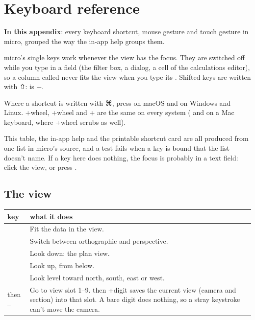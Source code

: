 \chapter{Keyboard reference}\label{app:keys}\label{ch:keys}

\begin{goals}
\textbf{In this appendix}: every keyboard shortcut, mouse gesture and touch gesture in micro, grouped
the way the in-app help groups them.
\end{goals}

micro's single keys work whenever the view has the focus. They are switched off while you type in a
field (the filter box, a dialog, a cell of the calculations editor), so a column called 
never fits the view when you type its . Shifted keys are written with ⇧:  is
+.

Where a shortcut is written with ⌘, press  on macOS and  on Windows and Linux.
+wheel, +wheel and +\key{\textasciigrave} are the same on every system
( and  on a Mac keyboard, where +wheel scrubs as well).

\begin{note}
This table, the in-app help and the printable shortcut card are all produced from one list in
micro's source, and a test fails when a key is bound that the list doesn't name. If a key here does
nothing, the focus is probably in a text field: click the view, or press .
\end{note}

\section{The view}\label{sec:keys-view}

\begin{tabularx}{\linewidth}{@{}p{30mm}L@{}}
\toprule
key & what it does \\
\midrule
{} & Fit the data in the view. \\
 & Switch between orthographic and perspective. \\
 & Look down: the plan view. \\
 & Look up, from below. \\
    & Look level toward north, south, east or west. \\
 then – & Go to view slot 1–9.  then +digit saves the current
  view (camera and section) into that slot. A bare digit does nothing, so a stray keystroke can't
  move the camera. \\
\bottomrule
\end{tabularx}

